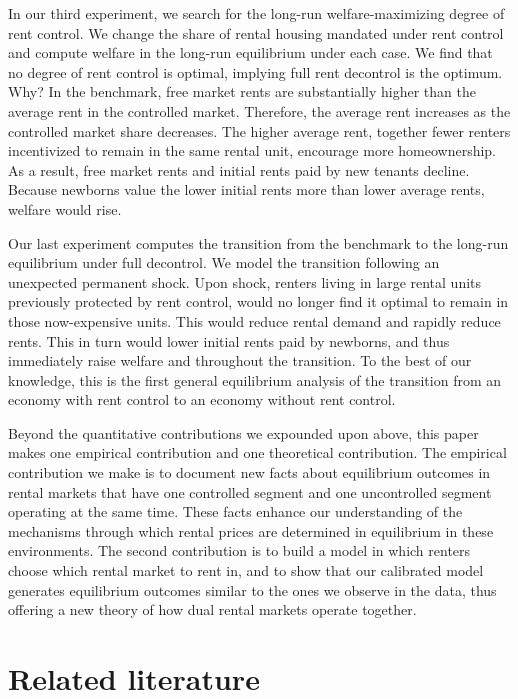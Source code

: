\documentclass[parskip=full]{article}
\begin{document}
In our third experiment, we search for the long-run welfare-maximizing degree of rent control. We change the share of rental housing mandated under rent control and compute welfare in the long-run equilibrium under each case. We find that no degree of rent control is optimal, implying full rent decontrol is the optimum. Why? In the benchmark, free market rents are substantially higher than the average rent in the controlled market. Therefore, the average rent increases as the controlled market share decreases. The higher average rent, together fewer renters incentivized to remain in the same rental unit, encourage more homeownership. As a result, free market rents and initial rents paid by new tenants decline. Because newborns value the lower initial rents more than lower average rents, welfare would rise. 

Our last experiment computes the transition from the benchmark to the long-run equilibrium under full decontrol. We model the transition following an unexpected permanent shock. Upon shock, renters living in large rental units previously protected by rent control, would no longer find it optimal to remain in those now-expensive units. This would reduce rental demand and rapidly reduce rents. This in turn would lower initial rents paid by newborns, and thus immediately raise welfare and throughout the transition. To the best of our knowledge, this is the first general equilibrium analysis of the transition from an economy with rent control to an economy without rent control.

Beyond the quantitative contributions we expounded upon above, this paper makes one empirical contribution and one theoretical contribution. The empirical contribution we make is to document new facts about equilibrium outcomes in rental markets that have one controlled segment and one uncontrolled segment operating at the same time. These facts enhance our understanding of the mechanisms through which rental prices are determined in equilibrium in these environments. The second contribution is to build a model in which renters choose which rental market to rent in, and to show that our calibrated model generates equilibrium outcomes similar to the ones we observe in the data, thus offering a new theory of how dual rental markets operate together. 

\section{Related literature}\label{sec:related_lit}
\end{document}
